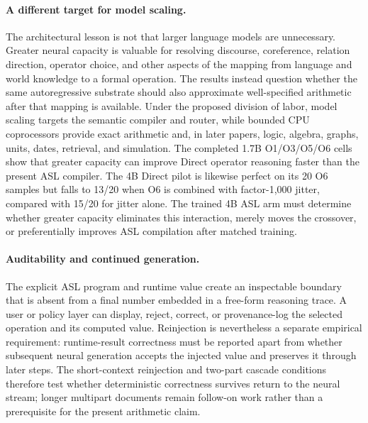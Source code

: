 \documentclass[11pt]{article}
\begin{document}
\paragraph{A different target for model scaling.}
The architectural lesson is not that larger language models are unnecessary.
Greater neural capacity is valuable for resolving discourse, coreference,
relation direction, operator choice, and other aspects of the mapping from
language and world knowledge to a formal operation.  The results instead
question whether the same autoregressive substrate should also approximate
well-specified arithmetic after that mapping is available.  Under the proposed
division of labor, model scaling targets the semantic compiler and router,
while bounded CPU coprocessors provide exact arithmetic and, in later papers,
logic, algebra, graphs, units, dates, retrieval, and simulation. The completed
1.7B O1/O3/O5/O6 cells show that greater capacity can improve Direct operator
reasoning faster than the present ASL compiler. The 4B Direct pilot is likewise
perfect on its 20 O6 samples but falls to 13/20 when O6 is combined with
factor-1,000 jitter, compared with 15/20 for jitter alone. The trained 4B ASL arm must
determine whether greater capacity eliminates this interaction, merely moves
the crossover, or preferentially improves ASL compilation after matched
training.

\paragraph{Auditability and continued generation.}
The explicit ASL program and runtime value create an inspectable boundary that
is absent from a final number embedded in a free-form reasoning trace.  A user
or policy layer can display, reject, correct, or provenance-log the selected
operation and its computed value.  Reinjection is nevertheless a separate
empirical requirement: runtime-result correctness must be reported apart from
whether subsequent neural generation accepts the injected value and preserves
it through later steps.  The short-context reinjection and two-part cascade
conditions therefore test whether deterministic correctness survives return to
the neural stream; longer multipart documents remain follow-on work rather than
a prerequisite for the present arithmetic claim.
\end{document}
